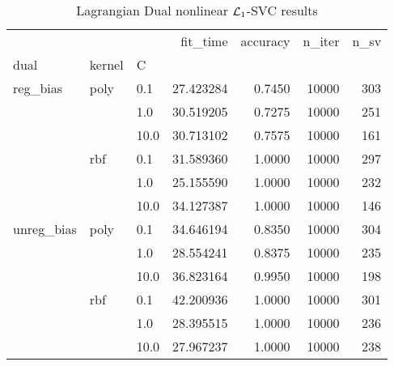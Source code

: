 \begin{table}[H]
\centering
\caption{Lagrangian Dual nonlinear $\protect \mathcal{L}_1$-SVC results}
\label{nonlinear_lagrangian_dual_l1_svc_cv_results}
\begin{tabular}{lllrrrr}
\toprule
           &     &      &   fit\_time &  accuracy &  n\_iter &  n\_sv \\
dual & kernel & C &            &           &         &       \\
\midrule
reg\_bias & poly & 0.1  &  27.423284 &    0.7450 &   10000 &   303 \\
           &     & 1.0  &  30.519205 &    0.7275 &   10000 &   251 \\
           &     & 10.0 &  30.713102 &    0.7575 &   10000 &   161 \\
           & rbf & 0.1  &  31.589360 &    1.0000 &   10000 &   297 \\
           &     & 1.0  &  25.155590 &    1.0000 &   10000 &   232 \\
           &     & 10.0 &  34.127387 &    1.0000 &   10000 &   146 \\
unreg\_bias & poly & 0.1  &  34.646194 &    0.8350 &   10000 &   304 \\
           &     & 1.0  &  28.554241 &    0.8375 &   10000 &   235 \\
           &     & 10.0 &  36.823164 &    0.9950 &   10000 &   198 \\
           & rbf & 0.1  &  42.200936 &    1.0000 &   10000 &   301 \\
           &     & 1.0  &  28.395515 &    1.0000 &   10000 &   236 \\
           &     & 10.0 &  27.967237 &    1.0000 &   10000 &   238 \\
\bottomrule
\end{tabular}
\end{table}
